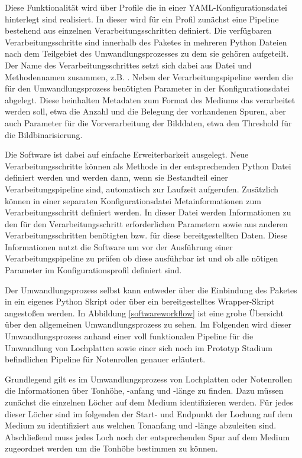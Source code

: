 Diese Funktionalität wird über Profile die in einer YAML-Konfigurationsdatei hinterlegt sind realisiert.
In dieser wird für ein Profil zunächst eine Pipeline bestehend aus einzelnen Verarbeitungsschritten definiert.
Die verfügbaren Verarbeitungsschritte sind innerhalb des Paketes in mehreren Python Dateien nach dem Teilgebiet des Umwandlungsprozesses zu dem sie gehören aufgeteilt.
Der Name des Verarbeitungsschrittes setzt sich dabei aus Datei und Methodennamen zusammen, z.B. .
Neben der Verarbeitungspipeline werden die für den Umwandlungsprozess benötigten Parameter in der Konfigurationsdatei abgelegt.
Diese beinhalten Metadaten zum Format des Mediums das verarbeitet werden soll, etwa die Anzahl und die Belegung der vorhandenen Spuren, aber auch Parameter für die Vorverarbeitung der Bilddaten, etwa den Threshold für die Bildbinarisierung.

Die Software ist dabei auf einfache Erweiterbarkeit ausgelegt.
Neue Verarbeitungsschritte können als Methode in der entsprechenden Python Datei definiert werden und werden dann, wenn sie Bestandteil einer Verarbeitungspipeline sind, automatisch zur Laufzeit aufgerufen.
Zusätzlich können in einer separaten Konfigurationsdatei Metainformationen zum Verarbeitungsschritt definiert werden.
In dieser Datei werden Informationen zu den für den Verarbeitungsschritt erforderlichen Parametern sowie aus anderen Verarbeitungsschritten benötigten bzw. für diese bereitgestellten Daten.
Diese Informationen nutzt die Software um vor der Ausführung einer Verarbeitungspipeline zu prüfen ob diese ausführbar ist und ob alle nötigen Parameter im Konfigurationsprofil definiert sind.

Der Umwandlungsprozess selbst kann entweder über die Einbindung des Paketes in ein eigenes Python Skript oder über ein bereitgestelltes Wrapper-Skript angestoßen werden.
In Abbildung \ref*{softwareworkflow} ist eine grobe Übersicht über den allgemeinen Umwandlungsprozess zu sehen.
Im Folgenden wird dieser Umwandlungsprozess anhand einer voll funktionalen Pipeline für die Umwandlung von Lochplatten sowie einer sich noch im Prototyp Stadium befindlichen Pipeline für Notenrollen genauer erläutert.

Grundlegend gilt es im Umwandlungsprozess von Lochplatten oder Notenrollen die Informationen über Tonhöhe, -anfang und -länge zu finden.
Dazu müssen zunächst die einzelnen Löcher auf dem Medium identifizieren werden.
Für jedes dieser Löcher sind im folgenden der Start- und Endpunkt der Lochung auf dem Medium zu identifiziert aus welchen Tonanfang und -länge abzuleiten sind.
Abschließend muss jedes Loch noch der entsprechenden Spur auf dem Medium zugeordnet werden um die Tonhöhe bestimmen zu können.

